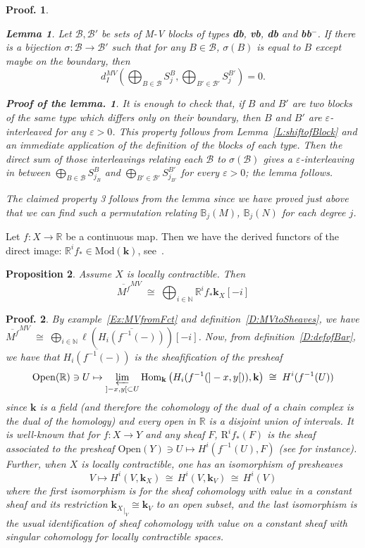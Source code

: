 \documentclass[a4paper, english, 11pt]{article}
\newcommand{\kk}[0]{\textbf{k}}
\newcommand{\Mod}[0]{\text{Mod}}
\newcommand{\0}{\vec{0}}
\newcommand{\R}[0]{\mathbb{R}}
\newcommand{\N}[0]{\mathbb{N}}
\newcommand{\Ouv}[0]{\mathrm{Open}}
\newcommand{\Hom}[0]{\text{Hom}}
\newcommand{\Rr}[0]{\text{R}}
\newtheorem{prop}{Proposition}[section]
\newtheorem*{pf}{Proof.} }
\newtheorem*{pfofLemma}{Proof of the lemma.} }
\newtheorem{lem}[prop]{Lemma}
\begin{document}
\begin{pf}
\begin{lem} Let $\mathcal{B}, \mathcal{B}'$ be sets of M-V blocks of types \textbf{db}, \textbf{vb}, \textbf{db} and \textbf{bb}$^-$. 
If there is a bijection $\sigma: \mathcal{B} \to \mathcal{B}'$  such that for any $B\in \mathcal{B}$, $\sigma(B)$ is equal to $B$ except maybe on the boundary, then 
$$d_I^{MV}\left(\bigoplus_{B\in \mathcal{B}} S^B_{j}, \bigoplus_{B'\in \mathcal{B}'} S^{B'}_{j}\right) =0.$$
\end{lem}
\begin{pfofLemma} It is enough to check that,
 if $B$ and $B'$ are two blocks of the same type which differs only on their boundary, then $B$ and $B'$ are $\varepsilon$-interleaved for any $\varepsilon >0$. This property follows from Lemma~\ref{L:shiftofBlock} and an immediate application of the definition of the blocks of each type. 
 Then  the direct sum of those interleavings relating each $\mathcal{B}$ to $\sigma(\mathcal{B})$  gives a $\varepsilon$-interleaving in between $\bigoplus_{B\in \mathcal{B}} S^B_{j_B}$ and  $\bigoplus_{B'\in \mathcal{B}'} S^{B'}_{j_{B'}}$ for every $\varepsilon >0$; the lemma follows.
\end{pfofLemma}
The  claimed property 3 follows from the lemma since we have proved just above that we can find such a 
permutation relating $\mathbb{B}_j(M)$, $\mathbb{B}_j(N)$ for each degree $j$.
\end{pf}


Let $f:X\to \R$ be a continuous map. Then we have the derived functors of the direct image: $\R^i f_* \in \Mod(\kk)$, see~\cite{Kash90, Iversen}.
\begin{prop}\label{P:MVmapstoRf} Assume $X$ is locally contractible. Then $$\overline{M^f}^{MV} \; \cong \; \bigoplus_{i\in \N} \R^if_* \kk_X [-i]$$
\end{prop}
\begin{pf}
 By example~\ref{Ex:MVfromFct} and definition~\ref{D:MVtoSheaves}, we have 
 $ \overline{M^f}^{MV} \; \cong  \; \bigoplus_{i\in \N} \ell (\overline{H_i(f^{-1}(-))}) [-i] $. 
 Now, from definition~\ref{D:defofBar}, we have that $\overline{H_i(f^{-1}(-))}$ is the sheafification of the presheaf 
 \[
 \Ouv(\R)\ni U \mapsto  \varprojlim_{]-x,y[\subset U} \Hom_{\kk}\left(H_i(f^{-1}(]-x,y[)) ,\kk\right) \; \cong\; H^i(f^{-1}(U))
 \]
since $\kk$ is a field (and therefore the cohomology of the dual of a chain complex is the dual of the homology) and every open in $\R$ is a disjoint union of intervals. It is well-known that for $f:X\to Y$ and any sheaf $F$,  $\Rr^i f_*(F)$ is the sheaf associated to the presheaf $\Ouv(Y)\ni U \mapsto  H^i(f^{-1}(U),F)$ (see \cite[Proposition 5.11]{Iversen} for instance). Further, when $X$ is locally contractible, one has an isomorphism of presheaves $$V\mapsto H^i(V,\kk_X) \, \cong \,H^i(V, \kk_V) \, \cong\, H^i(V)$$ where the first isomorphism is for the sheaf cohomology with value in a constant sheaf and its restriction ${\kk_X}_{|_V} \cong \kk_V$ to an open subset, and the last isomorphism is the usual identification of sheaf cohomology with value on a constant sheaf with singular cohomology for locally contractible spaces.
\end{pf}
\end{document}
